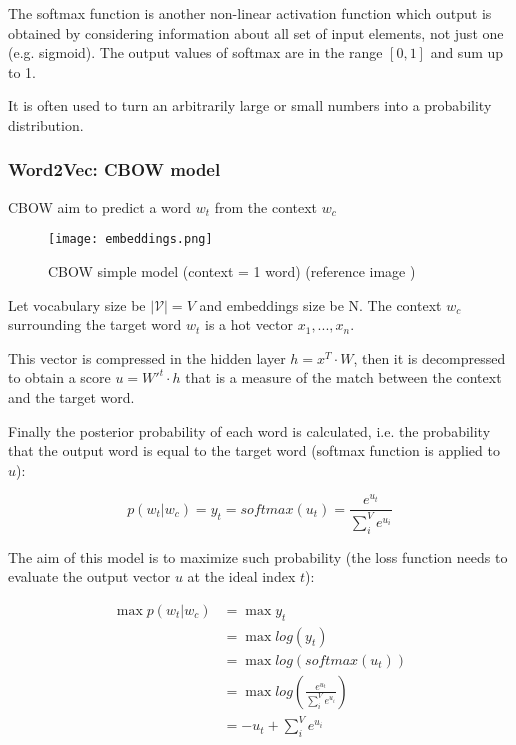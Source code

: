 The softmax function is another non-linear activation function which output is obtained by considering information about all set of input elements, not just one (e.g. sigmoid). The output values of softmax are in the range $[0,1]$ and sum up to 1.

It is often used to turn an arbitrarily large or small numbers into a probability distribution.

\subsubsection{Word2Vec: CBOW model}

CBOW aim to predict a word $w_t$ from the context $w_c$

\begin{figure}[H]
  \centering
  \texttt{[image: embeddings.png]}
  \caption{CBOW simple model (context = 1 word) (reference image \cite{w2ve})}
  \label{fig:emb}
\end{figure}

Let vocabulary size be $|\mathcal{V}| = V$ and embeddings size be N. The context $w_c$ surrounding the target word $w_t$ is a hot vector $x_1, ..., x_n$.

This vector is compressed in the hidden layer $h=x^T \cdot W$, then it is decompressed to obtain a score $u = W'^t \cdot h$ that is a measure of the match between the context and the target word.

Finally the posterior probability of each word is calculated, i.e. the probability that the output word is equal to the target word (softmax function is applied to $u$):

\begin{equation}
p(w_t | w_c) = y_t = softmax(u_t) = \frac{e^{u_t}}{\sum_i^V e^{u_i}}
\end{equation}

The aim of this model is to maximize such probability (the loss function needs
to evaluate the output vector $u$ at the ideal index $t$):

\begin{equation}
\begin{split}
\max p(w_t | w_c) &= \max y_t \\
&= \max log(y_t) \\
&= \max log(softmax(u_t)) \\
&= \max log \left( \frac{e^{u_t}}{\sum_i^V e^{u_i}} \right) \\
&= - u_t + \sum_i^V e^{u_i}
\end{split}
\end{equation}


